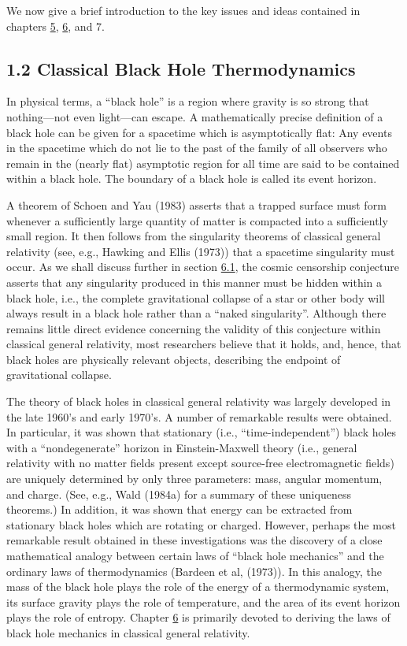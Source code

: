 \documentclass[11pt,a4paper]{article}
\begin{document}
We now give a brief introduction to the key issues and ideas contained in chapters \hyperlink{sec:5}{5}, \hyperlink{sec:6}{6}, and 7.

\subsection*{1.2 Classical Black Hole Thermodynamics}\hypertarget{sec:1.2}{}

In physical terms, a ``black hole'' is a region where gravity is so strong that nothing---not even light---can escape. A mathematically precise definition of a black hole can be given for a spacetime which is asymptotically flat: Any events in the spacetime which do not lie to the past of the family of all observers who remain in the (nearly flat) asymptotic region for all time are said to be contained within a \hypertarget{source-20}{} black hole. The boundary of a black hole is called its event horizon.

A theorem of Schoen and Yau (1983) asserts that a trapped surface must form whenever a sufficiently large quantity of matter is compacted into a sufficiently small region. It then follows from the singularity theorems of classical general relativity (see, e.g., Hawking and Ellis (1973)) that a spacetime singularity must occur. As we shall discuss further in section \hyperlink{sec:6.1}{6.1}, the cosmic censorship conjecture asserts that any singularity produced in this manner must be hidden within a black hole, i.e., the complete gravitational collapse of a star or other body will always result in a black hole rather than a ``naked singularity''. Although there remains little direct evidence concerning the validity of this conjecture within classical general relativity, most researchers believe that it holds, and, hence, that black holes are physically relevant objects, describing the endpoint of gravitational collapse.

The theory of black holes in classical general relativity was largely developed in the late 1960's and early 1970's. A number of remarkable results were obtained. In particular, it was shown that stationary (i.e., ``time-independent'') black holes with a ``nondegenerate'' horizon in Einstein-Maxwell theory (i.e., general relativity with no matter fields present except source-free electromagnetic fields) are uniquely determined by only three parameters: mass, angular momentum, and charge. (See, e.g., Wald (1984a) for a summary of these uniqueness theorems.) In addition, it was shown that energy can be extracted from stationary black holes which are rotating or charged. However, perhaps the most remarkable result obtained in these investigations was the discovery of a close mathematical analogy between certain laws of ``black hole mechanics'' and the ordinary laws of thermodynamics (Bardeen et al, (1973)). In this analogy, the mass of the black hole plays the role of the energy of a thermodynamic system, its surface gravity plays the role of temperature, and the area of its event horizon plays the role of entropy. Chapter \hyperlink{sec:6}{6} is primarily devoted to deriving the laws of black hole mechanics in classical general relativity.
\end{document}
